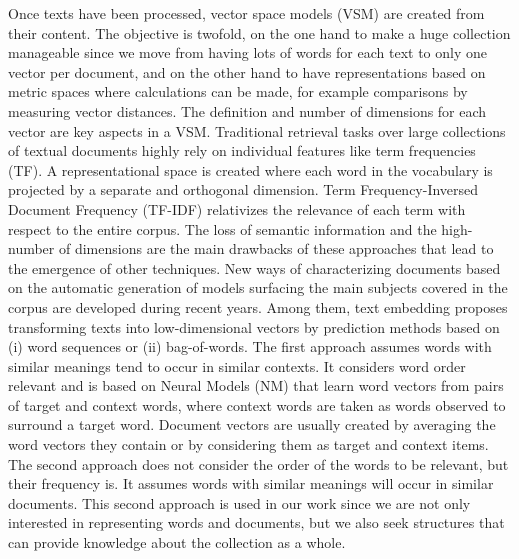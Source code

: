Once texts have been processed, vector space models (VSM) are created from their content. The objective is twofold, on the one hand to make a huge collection manageable since we move from having lots of words for each text to only one vector per document, and on the other hand to have representations based on metric spaces where calculations can be made, for example comparisons by measuring vector distances. The definition and number of dimensions for each vector are key aspects in a VSM. Traditional retrieval tasks over large collections of textual documents highly rely on individual features like term frequencies (TF)\cite{Hearst1999}. A representational space is created where each word in the vocabulary is projected by a separate and orthogonal dimension. Term Frequency-Inversed Document Frequency (TF-IDF) relativizes the relevance of each term with respect to the entire corpus. The loss of semantic information and the high-number of dimensions are the main drawbacks of these approaches that lead to the emergence of other techniques. New ways of characterizing documents based on the automatic generation of models surfacing the main subjects covered in the corpus are developed during recent years. Among them, text embedding proposes transforming texts into low-dimensional vectors by prediction methods based on (i) word sequences or (ii) bag-of-words. The first approach assumes words with similar meanings tend to occur in similar contexts. It considers word order relevant and is based on Neural Models (NM) that learn word vectors from pairs of target and context words, where context words are taken as words observed to surround a target word. Document vectors are usually created by averaging the word vectors they contain or by considering them as target and context items. The second approach does not consider the order of the words to be relevant, but their frequency is. It assumes words with similar meanings will occur in similar documents. This second approach is used in our work since we are not only interested in representing words and documents, but we also seek  structures that can provide knowledge about the collection as a whole.

